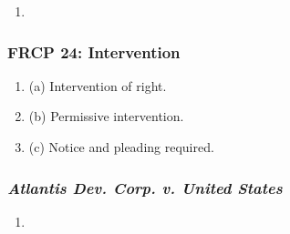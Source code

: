 \begin{enumerate}
    \item \end{enumerate}

\subsubsection{FRCP 24: Intervention}

\begin{enumerate}
    \item (a) Intervention of right.
    \item (b) Permissive intervention.
    \item (c) Notice and pleading required.
\end{enumerate}

\subsubsection{\emph{Atlantis Dev. Corp. v. United States}}

\begin{enumerate}
    \item \end{enumerate}

